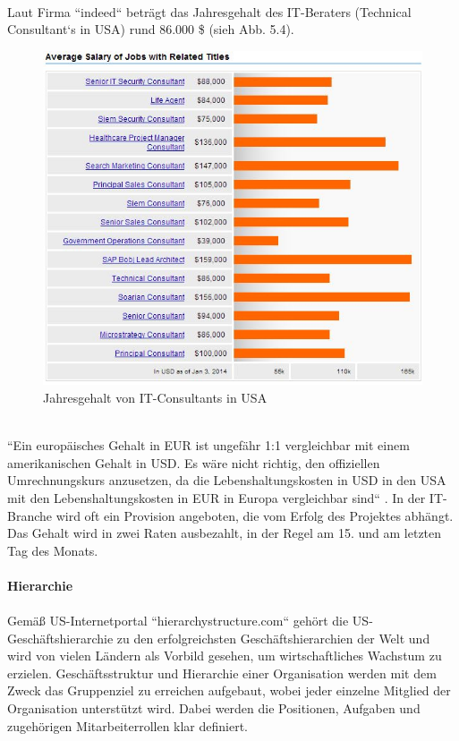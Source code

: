 		\\
		Laut Firma ``indeed`` beträgt das Jahresgehalt des IT-Beraters (Technical Consultant`s in USA) rund 86.000 \$ (sieh Abb. 5.4).
		\begin{figure}[ht]
				\centering
				\includegraphics[width=0.7\linewidth]{./images/Techn_Cons_Sal}
				\caption{Jahresgehalt von IT-Consultants in USA}
				\label{fig:TechConsSal}
				\end{figure}\\
		``Ein europäisches Gehalt in EUR ist ungefähr 1:1 vergleichbar mit einem 
		amerikanischen Gehalt in USD. Es wäre nicht richtig, den offiziellen Umrechnungskurs anzusetzen, da die Lebenshaltungskosten in USD in den USA mit den Lebenshaltungskosten in EUR in Europa vergleichbar sind`` \cite{InfoUSArbVertr}. In der IT-Branche wird oft ein Provision angeboten, die vom Erfolg des
		Projektes abhängt. Das Gehalt wird in zwei Raten ausbezahlt, in der Regel am 15. und am letzten Tag des Monats.\\ \\
	\textbf{Hierarchie} \\ \\
	Gemäß US-Internetportal ``hierarchystructure.com`` \cite{HierarchieUSA} gehört die US- Geschäftshierarchie zu den erfolgreichsten Geschäftshierarchien der Welt und wird von vielen Ländern als Vorbild gesehen, um wirtschaftliches Wachstum zu erzielen. Geschäftsstruktur und Hierarchie einer Organisation werden mit dem Zweck das Gruppenziel zu erreichen aufgebaut, wobei jeder einzelne Mitglied der Organisation unterstützt wird. Dabei werden die Positionen, Aufgaben und zugehörigen Mitarbeiterrollen klar definiert.
